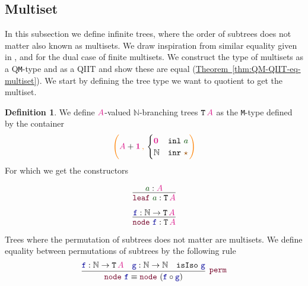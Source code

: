 \documentclass[twoside,11pt,openright]{report}
\theoremstyle{plain} %
\theoremstyle{definition}
\newtheorem{defn}[thm]{Definition}%
\theoremstyle{remark}
\newcommand*{\thmref}[1]{\hyperref[thm:#1]{Theorem~\ref*{thm:#1}}} %
\newcommand*{\term}[1]{\textcolor{green!30!black}{#1}} %
\newcommand*{\type}[1]{\textcolor{magenta!90!black}{#1}}
\newcommand*{\containerpair}[2]{\ensuremath{\colorlet{savedleftcolor}{.}\color{orange}\left(\color{savedleftcolor}#1\,\textcolor{orange}{\mathbf{,}}\,#2\color{orange}\right)\color{savedleftcolor}}}
\newcommand*{\unit}{\type{\textbf{1}}}
\newcommand*{\empt}{\type{\textbf{0}}}
\newcommand*{\constant}[1]{\textcolor{orange!60!black}{\ensuremath{\mathtt{#1}}}}
\newcommand*{\function}[1]{\textcolor{blue!60!black}{\ensuremath{\mathtt{#1}}}}
\newcommand*{\constructor}[1]{\textcolor{purple!60!black}{\ensuremath{\mathtt{#1}}}}
\newcommand*{\typeformer}[1]{\ensuremath{\mathtt{#1}}}
\newcommand*{\unitelem}{\constant{\star}} %
\begin{document}
\subsection{Multiset}
\label{sec:multiset}
In this subsection we define infinite trees, where the order of subtrees does not matter also known as multisets. We draw inspiration from similar equality given in \cite{DBLP:QIIT}, \cite{DBLP:tt-in-tt} and \cite{DBLP:Constructing-QIITs} for the dual case of finite multisets. We construct the type of multisets as a Q\texttt{M}-type and as a QIIT and show these are equal (\thmref{QM-QIIT-eq-multiset}). We start by defining the tree type we want to quotient to get the multiset.
\begin{defn}
  We define \(\type{A}\)-valued \(\mathbb{N}\)-branching trees \(\typeformer{T}\,\type{A}\) as the \texttt{M}-type defined by the container
  \begin{equation}
    \containerpair{\type{A}+\unit}{\begin{cases} \empt & \mathtt{inl}~\term{a} \\ \mathbb{N} & \mathtt{inr}~\unitelem \end{cases}}
  \end{equation}
  For which we get the constructors\\[-10mm]
  \begin{center}
    \strut
    \hfill
    \begin{minipage}[b]{0.25\linewidth}
      \begin{equation}
        \vcenter{\infer{\constructor{leaf}~\term{a} : \typeformer{T}\,\type{A}}{\term{a} : \type{A}}}
      \end{equation}
    \end{minipage}
    \hfill
    \begin{minipage}[b]{0.25\linewidth}
      \begin{equation}
        \vcenter{\infer{\constructor{node}~\function{f} : \typeformer{T}\,\type{A}}{\function{f} : \mathbb{N} \rightarrow \typeformer{T}\,\type{A}}}
      \end{equation}
    \end{minipage}
    \hfill
    \strut
  \end{center}
\end{defn}
\noindent Trees where the permutation of subtrees does not matter are multisets. We define equality between permutations of subtrees by the following rule
\begin{equation}
  \vcenter{\infer[\constructor{perm}]{\constructor{node}~\function{f} \equiv \constructor{node}~(\function{f} \circ \function{g})}{\function{f} : \mathbb{N} \rightarrow \typeformer{T}\,\type{A} & \function{g} : \mathbb{N} \rightarrow \mathbb{N} & \mathtt{isIso}~\function{g}}}
\end{equation}
\end{document}
